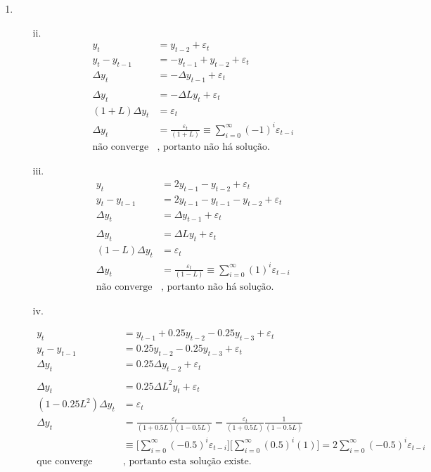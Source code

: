 \begin{enumerate}
\begin{enumerate}
\item %

\begin{enumerate}
	\item[ii.] 
	\begin{align*}
		y_t&=y_{t-2}+\varepsilon_t\\
		y_t-y_{t-1}&=-y_{t-1}+y_{t-2}+\varepsilon_t\\
		\Delta y_t&=-\Delta  y_{t-1}+\varepsilon_t\\
		\\
		\Delta y_t&=-\Delta  Ly_{t}+\varepsilon_t\\
		(1+L)\Delta y_t&=\varepsilon_t\\
		\Delta y_t&=\frac{\varepsilon_t}{(1+L)}\equiv \sum\limits_{i=0}^{\infty}(-1)^i\varepsilon_{t-i}\\
		\text{não converge}&\text{, portanto não há solução.}
	\end{align*}
	
	\item[iii.]
	\begin{align*}
		y_t&=2y_{t-1}-y_{t-2}+\varepsilon_t\\
		y_t-y_{t-1}&=2y_{t-1}-y_{t-1}-y_{t-2}+\varepsilon_t\\
		\Delta y_t&=\Delta y_{t-1}+\varepsilon_t\\
		\\
		\Delta y_t&=\Delta Ly_{t}+\varepsilon_t\\
		(1-L)\Delta y_t&=\varepsilon_t\\
		\Delta y_t&=\frac{\varepsilon_t}{(1-L)}\equiv\sum\limits_{i=0}^{\infty}(1)^i\varepsilon_{t-i}\\
		\text{não converge}&\text{, portanto não há solução.}
	\end{align*}
	
	\item[iv.]
	
	\begin{align*}
		y_t&=y_{t-1}+0.25y_{t-2}-0.25y_{t-3}+\varepsilon_t\\
		y_t-y_{t-1}&=0.25y_{t-2}-0.25y_{t-3}+\varepsilon_t\\
		\Delta y_t&=0.25\Delta y_{t-2}+\varepsilon_t\\
		\\
		\Delta y_t&=0.25\Delta L^2y_{t}+\varepsilon_t\\
		(1-0.25L^2)\Delta y_t&=\varepsilon_t\\
		\Delta y_t&=\frac{\varepsilon_t}{(1+0.5L)(1-0.5L)}=\frac{\varepsilon_t}{(1+0.5L)}\frac{1}{(1-0.5L)}\\
		&\equiv\Bigg[\sum\limits_{i=0}^{\infty}(-0.5)^i\varepsilon_{t-i}\Bigg]\Bigg[\sum\limits_{i=0}^{\infty}(0.5)^i(1)\Bigg]=2\sum\limits_{i=0}^{\infty}(-0.5)^i\varepsilon_{t-i}\\
		\text{que converge}&\text{, portanto esta solução existe.}
	\end{align*}	
\end{enumerate}


\end{enumerate}
\end{enumerate}
